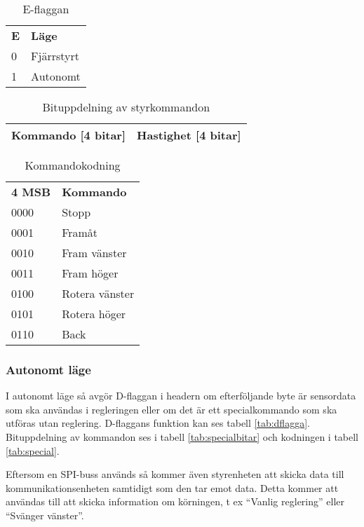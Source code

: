 \begin{table}[h]
  \centering
  \begin{tabular}{l l}
    \textbf{E} & \textbf{Läge} \\
    0 & Fjärrstyrt \\
    1 & Autonomt \\
  \end{tabular}
  \caption{E-flaggan}
  \label{tab:eflagga}
\end{table}
 
\begin{table}[h] 
  \centering
  \begin{tabular}{| c | c |}
    \hline
    Kommando [4 bitar] & Hastighet [4 bitar] \\ \hline
  \end{tabular}
  \caption{Bituppdelning av styrkommandon}
  \label{tab:styrbitar}
\end{table}

\begin{table}[h] 
  \centering
  \begin{tabular}{l l}
    \textbf{4 MSB} & \textbf{Kommando} \\
    0000 & Stopp \\
    0001 & Framåt \\
    0010 & Fram vänster \\
    0011 & Fram höger \\
    0100 & Rotera vänster \\
    0101 & Rotera höger \\
    0110 & Back \\
  \end{tabular}
  \caption{Kommandokodning}
  \label{tab:styrkommando}
\end{table}

\subsubsection{Autonomt läge}
I autonomt läge så avgör D-flaggan i headern om efterföljande byte är sensordata som ska användas i regleringen eller
om det är ett specialkommando som ska utföras utan reglering. D-flaggans funktion kan ses tabell \ref{tab:dflagga}.
Bituppdelning av kommandon ses i tabell \ref{tab:specialbitar} och kodningen i tabell \ref{tab:special}.

Eftersom en SPI-buss används så kommer även styrenheten att skicka data till kommunikationsenheten samtidigt som den tar emot data.
Detta kommer att användas till att skicka information om körningen, t ex ``Vanlig reglering'' eller ``Svänger vänster''.

